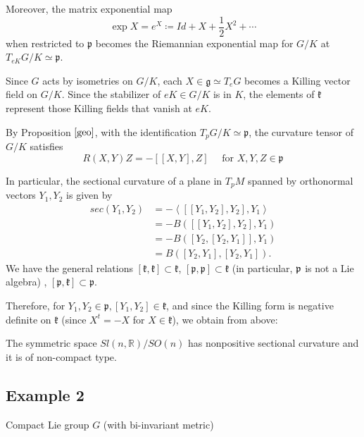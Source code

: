 	Moreover, the matrix exponential map 
	\[
	\exp X=e^{X}\coloneq {Id}+X+\frac{1}{2} X^{2}+\cdots
	\]
	when restricted to $\mathfrak{p}$ becomes the Riemannian
	exponential map for $G / K$ at $T_{e K} G / K \simeq
	\mathfrak{p}$. 
	
	Since $G$ acts by isometries on $G / K$, each $X \in
	\mathfrak{g} \simeq T_{e} G$ becomes a Killing vector field
	on $G / K$. Since the stabilizer of $e K \in G / K$ is in
	$K$, the elements of $\mathfrak{k}$ represent those Killing
	fields that vanish at $e K$. 

	By Proposition $\ref{geo}$,
		with the identification $T_{p} G / K \simeq
		\mathfrak{p}$, the curvature tensor of $G / K$ satisfies
		\[
		R(X, Y) Z=-[[X, Y], Z] \quad \text { for } X, Y, Z \in
		\mathfrak{p}
		\]

	
	In particular, the sectional curvature of a plane in $T_{p}
	M$ spanned by orthonormal vectors $Y_{1}, Y_{2}$ is given by
	\[
	\begin{aligned}
		sec\left(Y_{1}, Y_{2}\right)
		&=-\left\langle\left[\left[Y_{1}, Y_{2}\right],
		Y_{2}\right], Y_{1}\right\rangle \\
		&=-B\left(\left[\left[Y_{1}, Y_{2}\right], Y_{2}\right],
		Y_{1}\right) \\
		&=-B\left(\left[Y_{2},\left[Y_{2}, Y_{1}\right]\right],
		Y_{1}\right)\\
		&=B\left(\left[Y_{2}, Y_{1}\right],\left[Y_{2},
		Y_{1}\right]\right).
	\end{aligned}
	\]
	We have the general relations
	$
	[\mathfrak{k}, \mathfrak{k}] \subset \mathfrak{k}
	$,
	$[\mathfrak{p}, \mathfrak{p}] \subset \mathfrak{k}$ (in
	particular, ${\mathfrak p}$ is {not a Lie algebra) },
	$
	[\mathfrak{p}, \mathfrak{k}] \subset \mathfrak{p}
	$.
	
	Therefore, for $Y_{1}, Y_{2} \in \mathfrak{p},\left[Y_{1},
	Y_{2}\right] \in \mathfrak{k}$, and since the Killing form is
	negative definite on $\mathfrak{k}$ (since $X^{t}=-X$ for $X
	\in \mathfrak{k}$), we obtain from above:
	
		The symmetric space ${Sl}(n, \mathbb{R}) / S O(n)$ has
		nonpositive sectional curvature and it is of non-compact
		type.

\subsection{Example 2}
	
	\begin{center}
			Compact Lie group $G$ (with bi-invariant metric)
	\end{center}	
	
